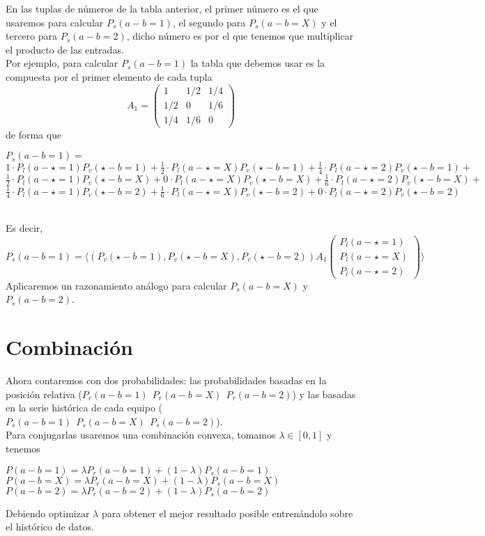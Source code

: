 En las tuplas de números de la tabla anterior, el primer número es el que usaremos para calcular $P_{s}(a-b=1)$, el segundo para $P_{s}(a-b=X)$ y el tercero para $P_{s}(a-b=2)$, dicho número es por el que tenemos que multiplicar el producto de las entradas.\\

Por ejemplo, para calcular $P_{s}(a-b=1)$ la tabla que debemos usar es la compuesta por el primer elemento de cada tupla\\
\[
A_{1}= \left(\begin{array}{ccc}
1 & 1/2 & 1/4\\
1/2 & 0 & 1/6\\
1/4 & 1/6 & 0
\end{array} \right)
\]
de forma que
\begin{center}
	$P_{s}(a-b=1)=$\\
	$1\cdotp P_{l}(a - \star=1)P_{v}(\star - b=1) + \frac{1}{2}\cdotp P_{l}(a - \star=X)P_{v}(\star - b=1) + \frac{1}{4}\cdotp P_{l}(a - \star=2)P_{v}(\star - b=1)+$\\ 
	$\frac{1}{2}\cdotp P_{l}(a - \star=1)P_{v}(\star - b=X) + 0\cdotp P_{l}(a - \star=X)P_{v}(\star - b=X) + \frac{1}{6}\cdotp P_{l}(a - \star=2)P_{v}(\star - b=X)+$\\
	$\frac{1}{4}\cdotp P_{l}(a - \star=1)P_{v}(\star - b=2) + \frac{1}{6}\cdotp P_{l}(a - \star=X)P_{v}(\star - b=2) + 0\cdotp P_{l}(a - \star=2)P_{v}(\star - b=2)\text{ } $ 
\end{center}
\ \\	
Es decir, $P_{s}(a-b=1)= 
\langle
(P_{v}(\star - b=1),P_{v}(\star - b=X),P_{v}(\star - b=2)) A_{1}  
\left(\begin{array}{c}
P_{l}(a - \star=1)\\
P_{l}(a - \star=X)\\
P_{l}(a - \star=2)
\end{array} \right)
\rangle $\\

Aplicaremos un razonamiento análogo para calcular $P_{s}(a-b=X)$ y $P_{s}(a-b=2)$.

\section{Combinación}
Ahora contaremos con dos probabilidades: las probabilidades basadas en la posición relativa ($P_{r}(a-b=1) \ \ P_{r}(a-b=X) \ \ P_{r}(a-b=2)$) y las basadas en la serie histórica de cada equipo ($P_{s}(a-b=1) \ \ P_{s}(a-b=X) \ \ P_{s}(a-b=2)$).\\

Para conjugarlas usaremos una combinación convexa, tomamos $\lambda \in [0,1]$ y tenemos
\begin{center}
	$ P(a-b=1) = \lambda P_{r}(a-b=1) + (1-\lambda) P_{s}(a-b=1)$\\
	$ P(a-b=X) = \lambda P_{r}(a-b=X) + (1-\lambda) P_{s}(a-b=X)$\\
	$ P(a-b=2) = \lambda P_{r}(a-b=2) + (1-\lambda) P_{s}(a-b=2)$
\end{center}
Debiendo optimizar $\lambda$ para obtener el mejor resultado posible entrenándolo sobre el histórico de datos.